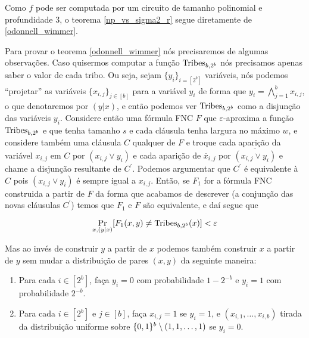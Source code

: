 Como $f$ pode ser computada por um circuito de tamanho polinomial e profundidade 3, o teorema \ref{np_vs_sigma2_r} segue diretamente de \ref{odonnell_wimmer}.

Para provar o teorema \ref{odonnell_wimmer} nós precisaremos de algumas observações. Caso quisermos computar a função $\text{Tribes}_{b, 2^{b}}$ nós precisamos apenas saber o valor de cada tribo. Ou seja, sejam $\{y_{i}\}_{i = [2^{b}]}$ variáveis, nós podemos ``projetar'' as variáveis $\{x_{i, j}\}_{j \in [b]}$ para a variável $y_{i}$ de forma que $y_{i} = \bigwedge_{j = 1}^{b} x_{i, j}$, o que denotaremos por $(y \lvert x)$, e então podemos ver $\text{Tribes}_{b, 2^{b}}$ como a disjunção das variáveis $y_{i}$. Considere então uma fórmula FNC $F$ que $\varepsilon$-aproxima a função $\text{Tribes}_{b, 2^{b}}$ e que tenha tamanho $s$ e cada cláusula tenha largura no máximo $w$, e considere também uma cláusula $C$ qualquer de $F$ e troque cada aparição da variável $x_{i, j}$ em $C$ por $(x_{i, j} \lor y_{i})$ e cada aparição de $\overline{x}_{i, j}$ por $\overline{(x_{i, j} \lor y_{i})}$ e chame a disjunção resultante de $C^{\prime}$. Podemos argumentar que $C^{\prime}$ é equivalente à $C$ pois $(x_{i, j} \lor y_{i})$ é sempre igual a $x_{i, j}$. Então, se $F_{1}$ for a fórmula FNC construida a partir de $F$ da forma que acabamos de descrever (a conjunção das novas cláusulas $C^{\prime}$) temos que $F_{1}$ e $F$ são equivalente, e daí segue que

\begin{equation*}
	\Pr_{x, (y \lvert x)}[F_{1}(x, y) \neq \text{Tribes}_{b, 2^{b}}(x)] < \varepsilon
\end{equation*}

Mas ao invés de construir $y$ a partir de $x$ podemos também construir $x$ a partir de $y$ sem mudar a distribuição de pares $(x, y)$ da seguinte maneira:

\begin{enumerate}

	\item Para cada $i \in [2^{b}]$, faça $y_{i} = 0$ com probabilidade $1 - 2^{-b}$ e $y_{i} = 1$ com probabilidade $2^{-b}$.
	
	\item Para cada $i \in [2^{b}]$ e $j \in [b]$, faça $x_{i, j} = 1$ se $y_{i} = 1$, e $(x_{i, 1}, \dots, x_{i, b})$ tirada da distribuição uniforme sobre $\{0, 1\}^{b} \setminus (1, 1, \dots, 1)$ se $y_{i} = 0$. 

\end{enumerate}

